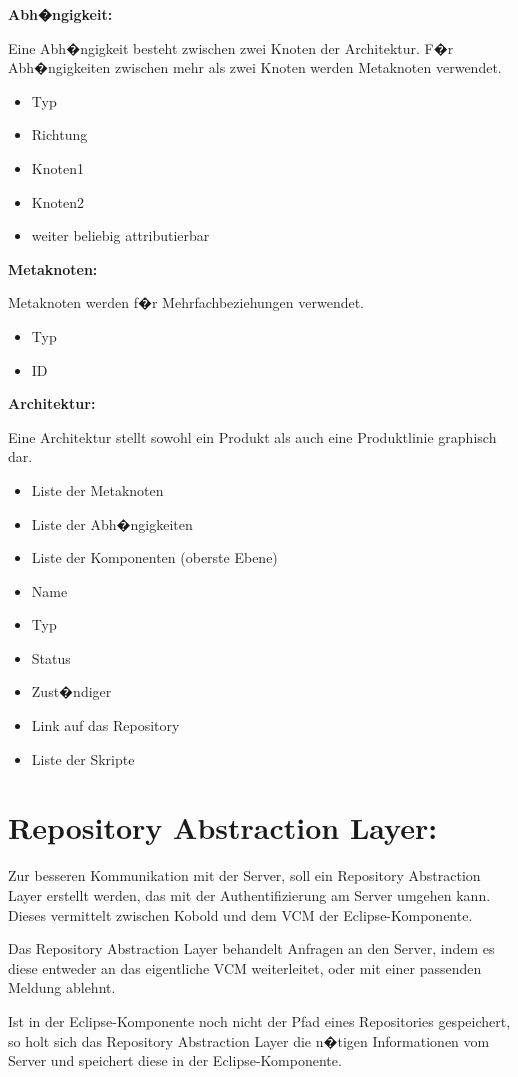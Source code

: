 \textbf{Abh�ngigkeit:}\par
Eine Abh�ngigkeit besteht zwischen zwei Knoten der Architektur. F�r Abh�ngigkeiten zwischen mehr als zwei Knoten werden Metaknoten verwendet.
\begin{itemize}
\item Typ
\item Richtung
\item Knoten1
\item Knoten2
\item weiter beliebig attributierbar\newline
\end{itemize}

\textbf{Metaknoten:}\par
Metaknoten werden f�r Mehrfachbeziehungen verwendet.
\begin{itemize}
\item Typ
\item ID\newline
\end{itemize}

\textbf{Architektur:}\par
Eine Architektur stellt sowohl ein Produkt als auch eine Produktlinie graphisch dar.
\begin{itemize}
\item Liste der Metaknoten
\item Liste der Abh�ngigkeiten
\item Liste der Komponenten (oberste Ebene)
\item Name
\item Typ
\item Status
\item Zust�ndiger
\item Link auf das Repository
\item Liste der Skripte
\end{itemize}


\section{Repository Abstraction Layer:}

Zur besseren Kommunikation mit der Server, soll ein Repository Abstraction Layer erstellt werden, das mit der Authentifizierung am Server umgehen kann. Dieses vermittelt zwischen Kobold und dem VCM der Eclipse-Komponente.\newline

Das Repository Abstraction Layer behandelt Anfragen an den Server, indem es diese entweder an das eigentliche VCM weiterleitet, oder mit einer passenden Meldung ablehnt.\par
Ist in der Eclipse-Komponente noch nicht der Pfad eines Repositories gespeichert, so holt sich das Repository Abstraction Layer die n�tigen Informationen vom Server und speichert diese in der Eclipse-Komponente.


